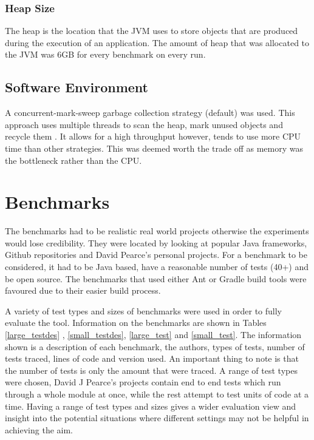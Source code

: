 \subsubsection{Heap Size}
The heap is the location that the JVM uses to store objects that are produced during the execution of an application. The amount of heap that was allocated to the JVM was 6GB for every benchmark on every run.

\subsection{Software Environment}

A concurrent-mark-sweep garbage collection strategy (default) was used. This approach uses multiple threads to scan the heap, mark unused objects and recycle them \cite{oracle2015}. It allows for a high throughput however, tends to use more CPU time than other strategies. This was deemed worth the trade off as memory was the bottleneck rather than the CPU.

\section{Benchmarks}
\label{S:bench}
The benchmarks had to be realistic real world projects otherwise the experiments would lose credibility. They were located by looking at popular Java frameworks, Github repositories and David Pearce's personal projects. For a benchmark to be considered, it had to be Java based, have a reasonable number of tests (40+) and be open source. The benchmarks that used either Ant or Gradle build tools were favoured due to their easier build process.

A variety of test types and sizes of benchmarks were used in order to fully evaluate the tool. Information on the benchmarks are shown in Tables \ref{large_testdes} , \ref{small_testdes}, \ref{large_test} and \ref{small_test}. The information shown is a description of each benchmark, the authors, types of tests, number of tests traced, lines of code and version used. An important thing to note is that the number of tests is only the amount that were traced. A range of test types were chosen, David J Pearce's projects contain end to end tests which run through a whole module at once, while the rest attempt to test units of code at a time. Having a range of test types and sizes gives a wider evaluation view and insight into the potential situations where different settings may not be helpful in achieving the aim.

